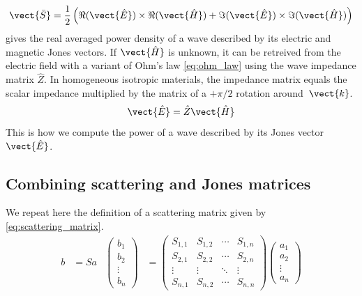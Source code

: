 \begin{equation}
    \vect{\bar{S}} = \frac{1}{2}
    \left(
        \Re(\vect{\hat{E}}) \times \Re(\vect{\hat{H}}) + 
        \Im(\vect{\hat{E}}) \times \Im(\vect{\hat{H}})
    \right)
    \label{eq:poynting_from_phasors}
\end{equation}
 gives the real averaged power density of a wave described by its electric and magnetic Jones vectors.
If $\vect{\hat{H}}$ is unknown, it can be retreived from the electric field with a variant of Ohm's law \eqref{eq:ohm_law} using the wave impedance matrix $\hat{Z}$.
In homogeneous isotropic materials, the impedance matrix equals the scalar impedance multiplied by the matrix of a $+\pi/2$ rotation around~$\vect{k}$.
\begin{equation}
    \vect{\hat{E}} = \hat{Z} \vect{\hat{H}} \label{eq:ohm_law}
\end{equation}
This is how we compute the power of a wave described by its Jones vector~$\vect{\hat{E}}$.



\subsection{Combining scattering and Jones matrices}
We repeat here the definition of a scattering matrix given by \vref{eq:scattering_matrix}.
\begin{align*}
    b &= S a
    &
    \begin{pmatrix}
        b_1\\
        b_2\\
        \vdots\\
        b_n
    \end{pmatrix}
    &=
    \begin{pmatrix}
        S_{1, 1} & S_{1, 2} & \cdots & S_{1, n} \\
        S_{2, 1} & S_{2, 2} & \cdots & S_{2, n} \\
        \vdots   & \vdots   & \ddots & \vdots   \\
        S_{n, 1} & S_{n, 2} & \cdots & S_{n, n}
    \end{pmatrix}
    \begin{pmatrix}
        a_1\\
        a_2\\
        \vdots\\
        a_n
    \end{pmatrix}
\end{align*}

